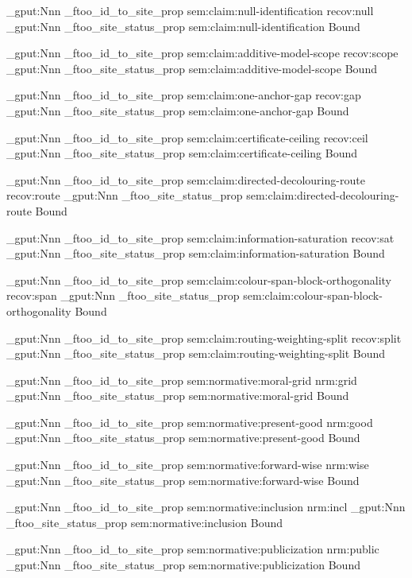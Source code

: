 \prop_gput:Nnn \g_ftoo_id_to_site_prop { sem:claim:null-identification } { recov:null }
\prop_gput:Nnn \g_ftoo_site_status_prop { sem:claim:null-identification } { Bound }

\prop_gput:Nnn \g_ftoo_id_to_site_prop { sem:claim:additive-model-scope } { recov:scope }
\prop_gput:Nnn \g_ftoo_site_status_prop { sem:claim:additive-model-scope } { Bound }

\prop_gput:Nnn \g_ftoo_id_to_site_prop { sem:claim:one-anchor-gap } { recov:gap }
\prop_gput:Nnn \g_ftoo_site_status_prop { sem:claim:one-anchor-gap } { Bound }

\prop_gput:Nnn \g_ftoo_id_to_site_prop { sem:claim:certificate-ceiling } { recov:ceil }
\prop_gput:Nnn \g_ftoo_site_status_prop { sem:claim:certificate-ceiling } { Bound }

\prop_gput:Nnn \g_ftoo_id_to_site_prop { sem:claim:directed-decolouring-route } { recov:route }
\prop_gput:Nnn \g_ftoo_site_status_prop { sem:claim:directed-decolouring-route } { Bound }

\prop_gput:Nnn \g_ftoo_id_to_site_prop { sem:claim:information-saturation } { recov:sat }
\prop_gput:Nnn \g_ftoo_site_status_prop { sem:claim:information-saturation } { Bound }

\prop_gput:Nnn \g_ftoo_id_to_site_prop { sem:claim:colour-span-block-orthogonality } { recov:span }
\prop_gput:Nnn \g_ftoo_site_status_prop { sem:claim:colour-span-block-orthogonality } { Bound }

\prop_gput:Nnn \g_ftoo_id_to_site_prop { sem:claim:routing-weighting-split } { recov:split }
\prop_gput:Nnn \g_ftoo_site_status_prop { sem:claim:routing-weighting-split } { Bound }

\prop_gput:Nnn \g_ftoo_id_to_site_prop { sem:normative:moral-grid } { nrm:grid }
\prop_gput:Nnn \g_ftoo_site_status_prop { sem:normative:moral-grid } { Bound }

\prop_gput:Nnn \g_ftoo_id_to_site_prop { sem:normative:present-good } { nrm:good }
\prop_gput:Nnn \g_ftoo_site_status_prop { sem:normative:present-good } { Bound }

\prop_gput:Nnn \g_ftoo_id_to_site_prop { sem:normative:forward-wise } { nrm:wise }
\prop_gput:Nnn \g_ftoo_site_status_prop { sem:normative:forward-wise } { Bound }

\prop_gput:Nnn \g_ftoo_id_to_site_prop { sem:normative:inclusion } { nrm:incl }
\prop_gput:Nnn \g_ftoo_site_status_prop { sem:normative:inclusion } { Bound }

\prop_gput:Nnn \g_ftoo_id_to_site_prop { sem:normative:publicization } { nrm:public }
\prop_gput:Nnn \g_ftoo_site_status_prop { sem:normative:publicization } { Bound }

